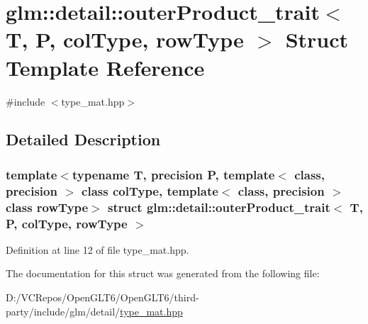 \hypertarget{structglm_1_1detail_1_1outer_product__trait}{}\section{glm\+::detail\+::outer\+Product\+\_\+trait$<$ T, P, col\+Type, row\+Type $>$ Struct Template Reference}
\label{structglm_1_1detail_1_1outer_product__trait}


{\ttfamily \#include $<$type\+\_\+mat.\+hpp$>$}



\subsection{Detailed Description}
\subsubsection*{template$<$typename T, precision P, template$<$ class, precision $>$ class col\+Type, template$<$ class, precision $>$ class row\+Type$>$\newline
struct glm\+::detail\+::outer\+Product\+\_\+trait$<$ T, P, col\+Type, row\+Type $>$}



Definition at line 12 of file type\+\_\+mat.\+hpp.



The documentation for this struct was generated from the following file\+:\begin{DoxyCompactItemize}
\item 
D\+:/\+V\+C\+Repos/\+Open\+G\+L\+T6/\+Open\+G\+L\+T6/third-\/party/include/glm/detail/\mbox{\hyperlink{type__mat_8hpp}{type\+\_\+mat.\+hpp}}\end{DoxyCompactItemize}
